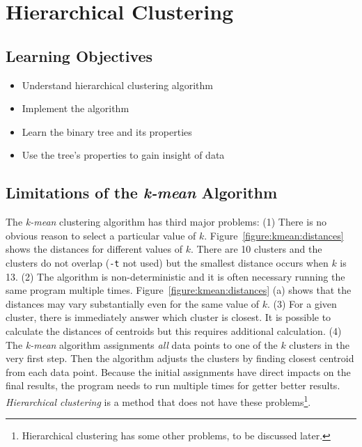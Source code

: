 \chapter{Hierarchical Clustering}


\section{Learning Objectives}

\begin{itemize}

\item Understand hierarchical clustering algorithm

\item Implement the algorithm
  
\item Learn the binary tree and its properties

\item Use the tree's properties to gain insight of data
  
\end{itemize}

\section{Limitations of the {\it k-mean} Algorithm}

The {\it k-mean} clustering algorithm has third major problems: (1)
There is no obvious reason to select a particular value of $k$.
Figure~\ref{figure:kmean:distances} shows the distances for different
values of $k$. There are 10 clusters and the clusters do not overlap
({\tt -t} not used) but the smallest distance occurs when $k$ is
13. (2) The algorithm is non-deterministic and it is often necessary
running the same program multiple times.
Figure~\ref{figure:kmean:distances} (a) shows that the distances may
vary substantially even for the same value of $k$.  (3) For a given
cluster, there is immediately answer which cluster is closest.  It is
possible to calculate the distances of centroids but this requires
additional calculation.  (4) The {\it k-mean} algorithm assignments
{\it all} data points to one of the $k$ clusters in the very first
step.  Then the algorithm adjusts the clusters by finding closest
centroid from each data point. Because the initial assignments have
direct impacts on the final results, the program needs to run multiple
times for getter better results.  {\it Hierarchical clustering} is a
method that does not have these problems\footnote{Hierarchical
  clustering has some other problems, to be discussed later.}.

